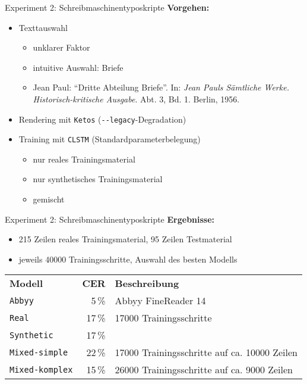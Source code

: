 \documentclass{bbawslides}
\begin{document}
\begin{bbawslide}{Experiment 2: Schreibmaschinentyposkripte}
  \vspace*{7mm}%
  \centerslidestrue%
  \textbf{Vorgehen:}
  \begin{itemize}
    \item Texttauswahl
    \begin{itemize}\small
      \item unklarer Faktor
      \item intuitive Auswahl: Briefe
      \item Jean Paul: \enquote{Dritte Abteilung Briefe}. In: \emph{Jean Pauls Sämtliche Werke. Historisch-kritische Ausgabe}. Abt. 3, Bd. 1. Berlin, 1956.
    \end{itemize}
    \item Rendering mit \texttt{Ketos} (\verb_--_\texttt{legacy}-Degradation)
    \item Training mit \texttt{CLSTM} (Standardparameterbelegung)
    \begin{itemize}\small
      \item nur reales Trainingsmaterial
      \item nur synthetisches Trainingsmaterial
      \item gemischt
    \end{itemize}
  \end{itemize}
\end{bbawslide}

\begin{bbawslide}{Experiment 2: Schreibmaschinentyposkripte}
  \vspace*{7mm}%
  \centerslidestrue%
  \textbf{Ergebnisse:}
  \begin{itemize}
    \item 215 Zeilen reales Trainingsmaterial, 95 Zeilen Testmaterial
    \item jeweils 40000 Trainingsschritte, Auswahl des besten Modells
  \end{itemize}
  \begin{tabular}{lrp{}}
    \textbf{Modell} & \textbf{CER} & \textbf{Beschreibung}\\
    \texttt{Abbyy} & 5\,\% & Abbyy FineReader 14\\
    \texttt{Real} & 17\,\% & 17000 Trainingsschritte \\
    \texttt{Synthetic} & 17\,\% \\
    \texttt{Mixed-simple} & 22\,\% & 17000 Trainingsschritte auf ca. 10000 Zeilen \\
    \texttt{Mixed-komplex} & 15\,\% & 26000 Trainingsschritte auf ca. 9000 Zeilen \\
  \end{tabular}
\end{bbawslide}
\end{document}
